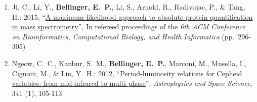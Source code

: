 \begin{enumerate}
    \item Ji, C., Li, Y., \textbf{Bellinger, E.~P.}, Li, S., Arnold, R., Radivojac, P., \& Tang, H.: 2015, 
    ``\href{https://dl.acm.org/citation.cfm?id=2808750}{A maximum-likelihood approach to absolute protein quantification in mass spectrometry}'', 
    In refereed proceedings of the \emph{6th ACM Conference on Bioinformatics, Computational Biology, and Health Informatics} (pp.~296-305)
    
    \item Ngeow, C.~C., Kanbur, S.~M., \textbf{Bellinger, E.~P.}, Marconi, M., Musella, I., Cignoni, M., \& Lin, Y.~H.: 2012,
    ``\href{http://adsabs.harvard.edu/abs/2012Ap\%26SS.341..105N}{Period-luminosity relations for Cepheid variables: from mid-infrared to multi-phase}'', 
    \emph{Astrophysics and Space Science}, 341 (1), 105-113%
\end{enumerate}

